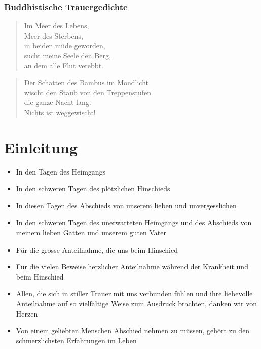 \documentclass[ngerman,a4paper,11pt]{scrreprt}
\begin{document}
\subsubsection*{Buddhistische Trauergedichte}
\label{sec-2-1-2-4-3}

\begin{verse}
Im Meer des Lebens, \\
Meer des Sterbens, \\
in beiden müde geworden, \\
sucht meine Seele den Berg, \\
an dem alle Flut verebbt. \\
\end{verse}

\begin{verse}
Der Schatten des Bambus im Mondlicht \\
wischt den Staub von den Treppenstufen \\
die ganze Nacht lang. \\
Nichts ist weggewischt! \\
\end{verse}

\clearpage

\section{Einleitung}
\label{sec-2-1-3}

\begin{itemize}
\item In den Tagen des Heimgangs
\item In den schweren Tagen des plötzlichen Hinschieds
\item In diesen Tagen des Abschieds von unserem lieben und unvergesslichen
\item In den schweren Tagen des unerwarteten Heimgangs und des Abschieds von
meinem lieben Gatten und unserem guten Vater
\item Für die grosse Anteilnahme, die uns beim Hinschied
\item Für die vielen Beweise herzlicher Anteilnahme während der Krankheit und
beim Hinschied
\item Allen, die sich in stiller Trauer mit uns verbunden fühlen und ihre
liebevolle Anteilnahme auf so vielfältige Weise zum Ausdruck brachten,
danken wir von Herzen
\item Von einem geliebten Menschen Abschied nehmen zu müssen, gehört zu den
schmerzlichsten Erfahrungen im Leben
\end{itemize}
\end{document}
